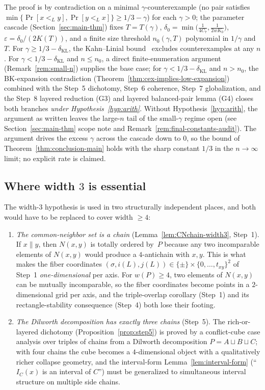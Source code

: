 \documentclass[11pt]{article}
\theoremstyle{definition}
\theoremstyle{remark}
\newcommand{\IC}{I_C}
\begin{document}
The proof is by contradiction on a minimal $\gamma$-counterexample
(no pair satisfies $\min\{\Pr[x<_L y],\Pr[y<_L x]\}\ge 1/3 - \gamma$)
for each $\gamma>0$; the parameter cascade
(Section~\ref{sec:main-thm})
fixes
$T=T(\gamma)$,
$\delta_0=\min\!\big(\tfrac{1}{4C_7},\tfrac{1}{2wK_0}\big)$,
$\varepsilon=\delta_0/(2K(T))$, and a finite size threshold
$n_0(\gamma,T)$ polynomial in $1/\gamma$ and $T$. For $\gamma \ge
1/3 - \delta_{\mathrm{KL}}$, the Kahn--Linial
bound~\cite{KahnLinial1991} excludes counter\-examples at any $n$.
For $\gamma < 1/3 - \delta_{\mathrm{KL}}$ and $n \le n_0$, a direct
finite-enumeration argument (Remark~\ref{rem:small-n})
supplies the base case; for $\gamma < 1/3 - \delta_{\mathrm{KL}}$
and $n > n_0$, the BK-expansion contradiction
(Theorem~\ref{thm:cex-implies-low-expansion}) combined with the
Step~5 dichotomy, Step~6 coherence, Step~7 globalization, and the
Step~8 layered reduction (G3) and layered balanced-pair lemma (G4)
closes both branches \emph{under Hypothesis~\ref{hyp:arith}}.
Without Hypothesis~\ref{hyp:arith}, the argument as written leaves
the large-$n$ tail of the small-$\gamma$ regime open (see
Section~\ref{sec:main-thm} scope note and
Remark~\ref{rem:final-constants-audit}). The argument drives the
excess $\gamma$ across the cascade down to $0$, so the bound of
Theorem~\ref{thm:conclusion-main} holds with the sharp constant
$1/3$ in the $n\to\infty$ limit; no explicit rate is claimed.

\subsection{Where width $3$ is essential}

The width-$3$ hypothesis is used in two structurally independent
places, and both would have to be replaced to cover width $\ge 4$:

\begin{enumerate}[nosep,label=(W\arabic*)]
 \item\label{W1} \emph{The common-neighbor set is a chain}
  (Lemma~\ref{lem:CNchain-width3}, Step~1). If $x\parallel y$, then
  $N(x,y)$ is totally ordered by~$P$ because any two incomparable
  elements of $N(x,y)$ would produce a $4$-antichain with $x,y$.
  This is what makes the fiber coordinates
  $(\sigma,i(L),j(L))\in\{\pm\}\times\{0,\dots,t_{xy}\}^2$ of
  Step~1 \emph{one-dimensional} per axis. For $w(P)\ge 4$, two
  elements of $N(x,y)$ can be mutually incomparable, so the fiber
  coordinates become points in a $2$-dimensional grid per axis, and
  the triple-overlap corollary (Step~1) and its rectangle-stability
  consequence (Step~4) both lose their footing.
 \item\label{W2} \emph{The Dilworth decomposition has exactly
  three chains} (Step~5). The rich-or-layered dichotomy
  (Proposition~\ref{prop:step5}) is proved by a conflict-cube case
  analysis over triples of chains from a Dilworth decomposition
  $P = A\sqcup B\sqcup C$; with four chains the cube becomes a
  $4$-dimensional object with a qualitatively richer collapse
  geometry, and the interval-form Lemma~\ref{lem:interval-form}
  (``$\IC(x)$ is an interval of $C$'') must be generalized to
  simultaneous interval structure on multiple side chains.
\end{enumerate}
\end{document}
